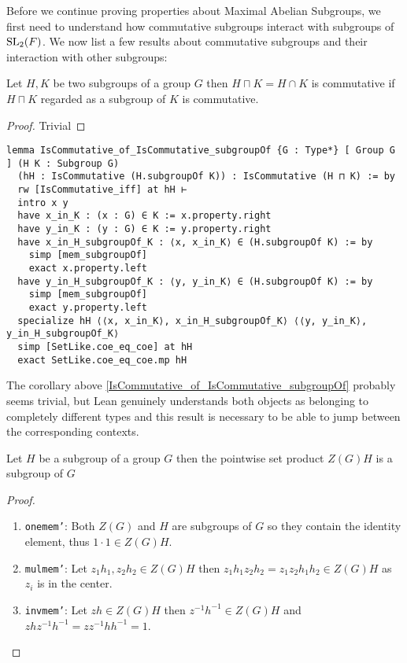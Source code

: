 Before we continue proving properties about Maximal Abelian Subgroups, we first need to understand how commutative subgroups interact with subgroups of $\operatorname{SL}_2(F)$. 
We now list a few results about commutative subgroups and their interaction with other subgroups:

\begin{corollary}
\label{IsCommutative_of_IsCommutative_subgroupOf}
\leanok
Let $H, K$ be two subgroups of a group $G$ then $H \sqcap K = H \cap K$ is commutative if $H \sqcap K$ regarded as a subgroup of $K$ is commutative.
\end{corollary}
\begin{proof}
  \leanok
Trivial
\end{proof}
\begin{footnotesize}
\begin{verbatim}
lemma IsCommutative_of_IsCommutative_subgroupOf {G : Type*} [ Group G ] (H K : Subgroup G)
  (hH : IsCommutative (H.subgroupOf K)) : IsCommutative (H ⊓ K) := by
  rw [IsCommutative_iff] at hH ⊢
  intro x y
  have x_in_K : (x : G) ∈ K := x.property.right
  have y_in_K : (y : G) ∈ K := y.property.right
  have x_in_H_subgroupOf_K : ⟨x, x_in_K⟩ ∈ (H.subgroupOf K) := by
    simp [mem_subgroupOf]
    exact x.property.left
  have y_in_H_subgroupOf_K : ⟨y, y_in_K⟩ ∈ (H.subgroupOf K) := by
    simp [mem_subgroupOf]
    exact y.property.left
  specialize hH ⟨⟨x, x_in_K⟩, x_in_H_subgroupOf_K⟩ ⟨⟨y, y_in_K⟩, y_in_H_subgroupOf_K⟩
  simp [SetLike.coe_eq_coe] at hH
  exact SetLike.coe_eq_coe.mp hH
\end{verbatim}
\end{footnotesize}

\begin{remark}
  The corollary above \ref{IsCommutative_of_IsCommutative_subgroupOf} probably seems trivial, but Lean genuinely understands both objects as belonging to completely different types and 
  this result is necessary to be able to jump between the corresponding contexts.
\end{remark}

\begin{lemma}
  \label{center_mul}
  \leanok
  Let $H$ be a subgroup of a group $G$ then the pointwise set product $Z(G) H$ is a subgroup of $G$
\end{lemma}
\begin{proof}
\leanok
\begin{enumerate}
  \item \texttt{one\textunderscore mem'}: Both $Z(G)$ and $H$ are subgroups of $G$ so they contain the identity element, thus $1 \cdot 1 \in Z(G) H$.
  \item \texttt{mul\textunderscore mem'}: Let $z_1 h_1, z_2 h_2 \in Z(G) H$ then $z_1h_1z_2h_2 = z_1z_2 h_1h_2 \in Z(G) H$ as $z_i$ is in the center.
  \item \texttt{inv\textunderscore mem'}: Let $zh \in Z(G) H$ then $z^{-1} h^{-1} \in Z(G) H$ and $z h z^{-1} h^{-1} = zz^{-1}h h^{-1} = 1$.
\end{enumerate}
\end{proof}

